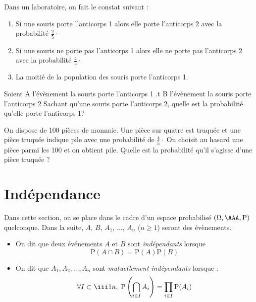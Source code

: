 \documentclass[french,11pt,twoside]{VcCours}
\renewcommand{\P}{\text{P}}
\begin{document}
\begin{Exemple} Dans un laboratoire, on fait le constat suivant :
\begin{enumerate}
\item Si une souris porte l'anticorps 1 alors elle porte l'anticorps 2 avec la probabilité $\frac{2}{5} \cdot$

\vspace{-0.2cm}
\item Si une souris ne porte pas l'anticorps 1 alors elle ne porte pas l'anticorps 2 avec la probabilité $\frac{4}{5} \cdot$
\item La moitié de la population des souris porte l'anticorps 1.
\end{enumerate}

Soient A l'évènement \og la souris porte l'anticorps 1 \fg{}.t B l'évènement \og la souris porte l'anticorps 2 \fg{} 
Sachant qu'une souris porte l'anticorps 2, quelle est la probabilité qu'elle porte l'anticorps 1?

\end{Exemple}


\begin{ApplicationDirecte}{} On dispose de 100 pièces de monnaie. Une pièce sur quatre est truquée et une pièce truquée indique pile avec une probabilité de $\frac{4}{5} \cdot$ On choisit au hasard une pièce parmi les 100 et on obtient pile. Quelle est la probabilité qu'il s'agisse d'une pièce truquée ?
\end{ApplicationDirecte}
\newpage

\section{Indépendance}
Dans cette section, on se place dans le cadre d'un espace probabilisé $(\Omega, \AAA, \P)$ quelconque. Dans la suite, $A$, $B$, $A_1$, $\ldots$, $A_n$ ($n \geq 1$) seront des évènements.



\begin{Definition}{}
\begin{itemize}
 \item On dit que deux événements $A$ et $B$ sont \emph{indépendants} lorsque 
$$\P(A \cap B)= \P(A)\P(B)$$
 \item On dit que $A_1,A_2,\ldots,A_n$ sont \emph{mutuellement indépendants} lorsque :
$$\forall I \subset \iii 1n,\;\P\left(\bigcap_{i \in I}A_i\right)= \prod_{i \in I}\P(A_i)$$
\end{itemize}
\end{Definition}
\end{document}
